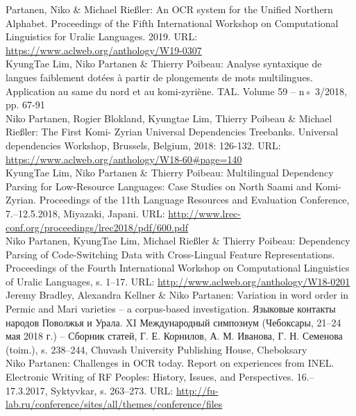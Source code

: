 \documentclass[11pt, a4paper]{article}
\newcommand{\years}[1]{\marginnote{\scriptsize #1}} %
\begin{document}
\years{2019}Partanen, Niko \& Michael Rießler: An OCR system for the Unified Northern Alphabet. Proceedings of the Fifth International Workshop on Computational Linguistics for Uralic Languages. 2019. URL: \url{https://www.aclweb.org/anthology/W19-0307}\\

\years{2018}KyungTae Lim, Niko Partanen \& Thierry Poibeau: Analyse syntaxique de langues faiblement dotées à partir de plongements de mots multilingues. Application au same du nord et au komi-zyriène. TAL. Volume 59 – n◦ 3/2018, pp. 67-91\\

\years{2018} Niko Partanen, Rogier Blokland, Kyungtae Lim, Thierry Poibeau \& Michael Rießler: The First Komi- Zyrian Universal Dependencies Treebanks. Universal dependencies Workshop, Brussels, Belgium, 2018: 126-132. URL: \url{https://www.aclweb.org/anthology/W18-60#page=140}\\

\years{2018} KyungTae Lim, Niko Partanen \& Thierry Poibeau: Multilingual Dependency Parsing for Low-Resource Languages: Case Studies on North Saami and Komi-Zyrian. Proceedings of the 11th Language Resources and Evaluation Conference, 7.--12.5.2018, Miyazaki, Japani. URL: \url{http://www.lrec-conf.org/proceedings/lrec2018/pdf/600.pdf}\\

\years{2018} Niko Partanen, KyungTae Lim, Michael Rießler \& Thierry Poibeau: Dependency Parsing of Code-Switching Data with Cross-Lingual Feature Representations. Proceedings of the Fourth International Workshop on Computational Linguistics of Uralic Languages, s. 1--17. URL: \url{http://www.aclweb.org/anthology/W18-0201}\\

\years{2018} Jeremy Bradley, Alexandra Kellner \& Niko Partanen: Variation in word order in Permic and Mari varieties – a corpus-based investigation. Языковые контакты народов Поволжья и Урала. XI Международный симпозиум (Чебоксары, 21–24 мая 2018 г.) – Сборник статей, Г. Е. Корнилов, А. М. Иванова, Г. Н. Семенова (toim.), s. 238–244, Chuvash University Publishing House, Cheboksary\\

\years{2017} Niko Partanen: Challenges in OCR today. Report on experiences from INEL. Electronic Writing of RF Peoples: History, Issues, and Perspectives. 16.--17.3.2017, Syktyvkar, s. 263--273. URL: \url{http://fu-lab.ru/conference/sites/all/themes/conference/files}\\
\end{document}
